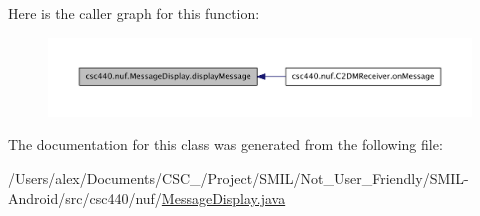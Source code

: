 Here is the caller graph for this function\-:
\nopagebreak
\begin{figure}[H]
\begin{center}
\leavevmode
\includegraphics[width=350pt]{classcsc440_1_1nuf_1_1_message_display_adf7092394387e6226d21bfa80c15b28d_icgraph}
\end{center}
\end{figure}




The documentation for this class was generated from the following file\-:\begin{DoxyCompactItemize}
\item 
/\-Users/alex/\-Documents/\-C\-S\-C\-\_/\-Project/\-S\-M\-I\-L/\-Not\-\_\-\-User\-\_\-\-Friendly/\-S\-M\-I\-L-\/\-Android/src/csc440/nuf/\hyperlink{_message_display_8java}{Message\-Display.\-java}\end{DoxyCompactItemize}

